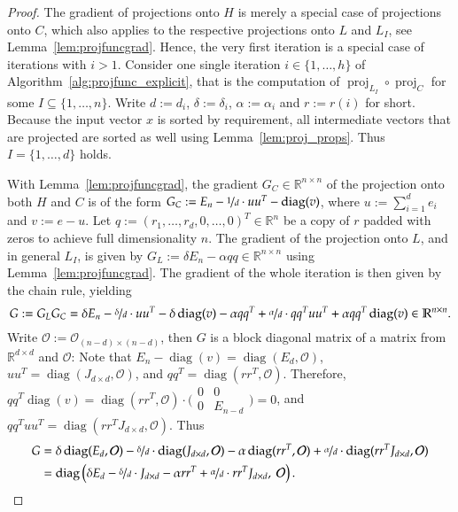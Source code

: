 \documentclass[twoside,11pt]{article}
\DeclareMathOperator{\proj}{proj}
\DeclareMathOperator{\diag}{diag}
\newcommand{\R}{\mathbb{R}}
\newcommand{\0}{\mathcal{O}}
\newcommand{\transp}{^T}
\newcommand{\discint}[2]{\{#1,\dotsc,#2\}}
\newcommand{\inint}[2]{\in\discint{#1}{#2}}
\begin{document}
\begin{proof}
The gradient of projections onto $H$ is merely a special case of projections onto $C$, which also applies to the respective projections onto $L$ and $L_I$, see Lemma~\ref{lem:projfuncgrad}.
Hence, the very first iteration is a special case of iterations with $i > 1$.
Consider one single iteration $i\inint{1}{h}$ of Algorithm~\ref{alg:projfunc_explicit}, that is the computation of $\proj_{L_I}\circ\proj_C$ for some $I\subseteq\discint{1}{n}$.
Write $d := d_i$, $\delta := \delta_i$, $\alpha := \alpha_i$ and $r := r(i)$ for short.
Because the input vector $x$ is sorted by requirement, all intermediate vectors that are projected are sorted as well using Lemma~\ref{lem:proj_props}.
Thus $I = \discint{1}{d}$ holds.

With Lemma~\ref{lem:projfuncgrad}, the gradient $G_C\in\R^{n\times n}$ of the projection onto both $H$ and $C$ is of the form $G_C := E_n - \nicefrac{1}{d}\cdot uu\transp - \diag(v)$, where $u := \sum_{i=1}^de_i$ and $v := e - u$.
Let $q := \left(r_1,\dotsc,r_d,0,\dotsc,0\right)\transp\in\R^n$ be a copy of $r$ padded with zeros to achieve full dimensionality $n$.
The gradient of the projection onto $L$, and in general $L_I$, is given by $G_L := \delta E_n - \alpha qq\in\R^{n\times n}$ using Lemma~\ref{lem:projfuncgrad}.
The gradient of the whole iteration is then given by the chain rule, yielding
\begin{displaymath}
  G := G_LG_C = \delta E_n - \nicefrac{\delta}{d}\cdot uu\transp - \delta\diag(v) - \alpha qq\transp + \nicefrac{\alpha}{d}\cdot qq\transp uu\transp + \alpha qq\transp\diag(v)\in\R^{n\times n}\text{.}
\end{displaymath}
Write $\0 := \0_{(n-d)\times(n-d)}$, then $G$ is a block diagonal matrix of a matrix from $\R^{d\times d}$ and $\0$:
Note that $E_n - \diag(v) = \diag(E_d, \0)$, $uu\transp = \diag(J_{d\times d}, \0)$, and $qq\transp = \diag(rr\transp, \0)$.
Therefore, $qq\transp\diag(v) = \diag(rr\transp, \0)\cdot\big(\begin{smallmatrix}0&0\\0&E_{n-d}\end{smallmatrix}\big) = 0$, and $qq\transp uu\transp = \diag(rr\transp J_{d\times d}, \0)$.
Thus
\begin{align*}
  G &= \delta \diag(E_d, \0) - \nicefrac{\delta}{d}\cdot\diag(J_{d\times d}, \0) - \alpha\diag(rr\transp, \0) + \nicefrac{\alpha}{d}\cdot\diag(rr\transp J_{d\times d}, \0)\\
  &= \diag\left(\delta E_d - \nicefrac{\delta}{d}\cdot J_{d\times d} - \alpha rr\transp + \nicefrac{\alpha}{d}\cdot rr\transp J_{d\times d},\ \0\right)\text{.}

\end{align*}
\end{proof}
\end{document}
